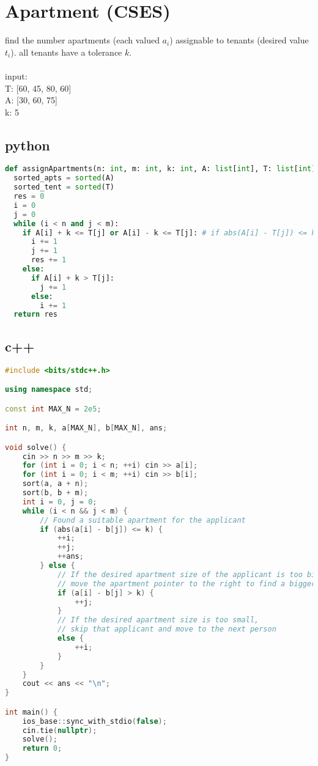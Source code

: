\documentclass[11pt]{article}
\begin{document}
\section{Apartment (CSES)}
find the number apartments (each valued $a_{i}$) assignable to tenants (desired value $t_{i}$). all tenants have a tolerance $k$.\\\;\\
input:\\
T: [60, 45, 80, 60]\\
A: [30, 60, 75]\\
k: 5 
\subsection{python}
\begin{lstlisting}[language=Python]
def assignApartments(n: int, m: int, k: int, A: list[int], T: list[int]):
  sorted_apts = sorted(A)
  sorted_tent = sorted(T)
  res = 0
  i = 0
  j = 0
  while (i < n and j < m):
    if A[i] + k <= T[j] or A[i] - k <= T[j]: # if abs(A[i] - T[j]) <= k
      i += 1
      j += 1
      res += 1
    else:
      if A[i] + k > T[j]:
        j += 1
      else:
        i += 1
  return res
\end{lstlisting}
\subsection{c++}
\begin{lstlisting}[language=c++]
#include <bits/stdc++.h>

using namespace std;

const int MAX_N = 2e5;

int n, m, k, a[MAX_N], b[MAX_N], ans;

void solve() {
	cin >> n >> m >> k;
	for (int i = 0; i < n; ++i) cin >> a[i];
	for (int i = 0; i < m; ++i) cin >> b[i];
	sort(a, a + n);
	sort(b, b + m);
	int i = 0, j = 0;
	while (i < n && j < m) {
		// Found a suitable apartment for the applicant
		if (abs(a[i] - b[j]) <= k) {
			++i;
			++j;
			++ans;
		} else {
			// If the desired apartment size of the applicant is too big,
			// move the apartment pointer to the right to find a bigger one
			if (a[i] - b[j] > k) {
				++j;
			}
			// If the desired apartment size is too small,
			// skip that applicant and move to the next person
			else {
				++i;
			}
		}
	}
	cout << ans << "\n";
}

int main() {
	ios_base::sync_with_stdio(false);
	cin.tie(nullptr);
	solve();
	return 0;
}
\end{lstlisting}
\end{document}
